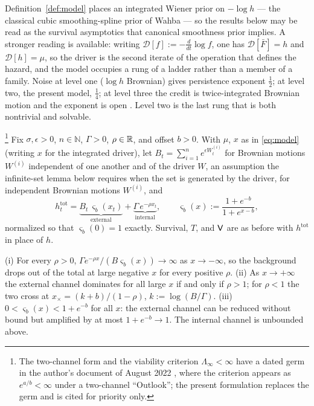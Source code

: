 \begin{remark}
Definition~\ref{def:model} places an integrated Wiener prior on
$-\log h$ --- the classical cubic smoothing-spline prior of Wahba
\cite{Wah78} --- so the results below may be read as the survival
asymptotics that canonical smoothness prior implies. A stronger
reading is available: writing $\mathcal D[f]:=-\frac{d}{dt}\log f$,
one has $\mathcal D[\bar F]=h$ and $\mathcal D[h]=\mu$, so the driver
is the second iterate of the operation that defines the hazard, and
the model occupies a rung of a ladder rather than a member of a
family. Noise at level one ($\log h$ Brownian) gives persistence
exponent $\tfrac12$; at level two, the present model, $\tfrac14$; at
level three the credit is twice-integrated Brownian motion and the
exponent is open \cite{AS15,AD13}. Level two is the last rung that is
both nontrivial and solvable.
\end{remark}

\begin{definition}\label{def:twochannel}\footnote{The
two-channel form and the viability criterion $\Lambda_\infty<\infty$
have a dated germ in the author's document of August 2022
\cite{GoldenScience2022}, where the criterion appears as $e^{a/b}<\infty$
under a two-channel ``Outlook''; the present formulation replaces the
germ and is cited for priority only.}
Fix $\sigma,\epsilon>0$, $n\in\mathbb N$, $\Gamma>0$, $\rho\in\mathbb{R}$, and
offset $b>0$. With $\mu$, $x$ as in \eqref{eq:model} (writing $x$ for
the integrated driver), let
$B_t=\sum_{i=1}^n e^{\epsilon W^{(i)}_t}$ for Brownian motions
$W^{(i)}$ independent of one another and of the driver $W$, an
assumption the infinite-set lemma below requires when the set is
generated by the driver, for independent Brownian
motions $W^{(i)}$, and
\begin{equation}\label{eq:hazard}
h^{\mathrm{tot}}_t
=\underbrace{B_t\,\varsigma_b(x_t)}_{\text{external}}
+\underbrace{\Gamma\,e^{-\rho x_t}}_{\text{internal}},
\qquad
\varsigma_b(x):=\frac{1+e^{-b}}{1+e^{x-b}},
\end{equation}
normalized so that $\varsigma_b(0)=1$ exactly. Survival, $T$, and
$\mathsf{V}$ are as before with $h^{\mathrm{tot}}$ in place of $h$.
\end{definition}

\begin{proposition}
\label{prop:dominance}
(i) For every $\rho>0$,
$\Gamma e^{-\rho x}/(B\varsigma_b(x))\to\infty$ as $x\to-\infty$, so
the background drops out of the total at large negative $x$ for every
positive $\rho$. (ii) As $x\to+\infty$ the external channel dominates
for all large $x$ if and only if $\rho>1$; for $\rho<1$ the two cross
at $x_\times=(k+b)/(1-\rho)$, $k:=\log(B/\Gamma)$. (iii)
$0<\varsigma_b(x)<1+e^{-b}$ for all $x$: the external channel can be
reduced without bound but amplified by at most $1+e^{-b}\to1$. The
internal channel is unbounded above.
\end{proposition}

